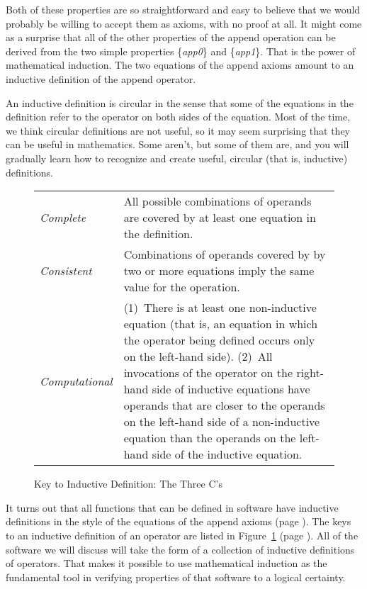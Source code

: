Both of these properties are so straightforward and easy to believe
that we would probably be willing to accept them as axioms, with no proof at all.
It might come as a surprise that all of the other properties
of the append operation can be derived from
the two simple properties \{\emph{app0}\} and \{\emph{app1}\}.
That is the power of mathematical induction.
The two equations of the append axioms
amount to an inductive definition of the append operator.

An inductive definition is circular in the sense
that some of the equations in the definition refer
to the operator on both sides of the equation.
Most of the time, we think circular definitions are not useful,
so it may seem surprising that they can be useful in mathematics.
Some aren't, but some of them are, and you will
gradually learn how to recognize and create useful,
circular (that is, inductive) definitions.

\begin{figure}
\begin{center}
\begin{tabular}{lp{3.5in}}
\emph{Complete} & All possible combinations of operands are covered by at least one equation in the definition. \\
\emph{Consistent} & Combinations of operands covered by by two or more equations imply the same value for the operation. \\
\emph{Computational} & (1)~There is at least one non-inductive equation (that is, an equation in which the operator being defined
occurs only on the left-hand side).
(2)~All invocations of the operator on the right-hand side of inductive equations
have operands that are closer to the operands on the left-hand side of a non-inductive equation
than the operands on the left-hand side of the inductive equation.
\end{tabular}
\end{center}
\caption{Key to Inductive Definition: The Three C's}
\label{fig:inductive-def-keys}
\end{figure}

It turns out that all functions that can be defined in software
have inductive definitions in the style of the equations of the append axioms (page \pageref{append-equations}).
The keys to an inductive definition of an operator are listed in Figure~\ref{fig:inductive-def-keys}
(page \pageref{fig:inductive-def-keys}). All of the software we will discuss will take the form of a collection of inductive definitions of operators. That makes it possible to use mathematical induction as the fundamental tool in verifying properties of that software to a logical certainty.

